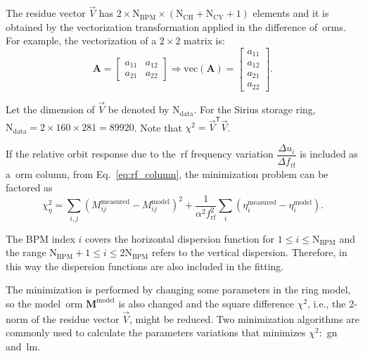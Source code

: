 The residue vector $\vec{V}$ has $2 \times \mathrm{N}_{\mathrm{BPM}} \times \left(\mathrm{N}_{\mathrm{CH}} + \mathrm{N}_{\mathrm{CV}}+1\right)$ elements and it is obtained by the vectorization transformation applied in the difference of~\gls{orm}s. For example, the vectorization of a $2 \times 2$ matrix is:
\begin{equation}
        \mathbf{A} = \begin{bmatrix}
     a_{11} & a_{12} \\
     a_{21} & a_{22} 
\end{bmatrix} \Rightarrow \mathrm{vec}\left(\mathbf{A}\right) = \begin{bmatrix}
     a_{11}  \\
     a_{12} \\
     a_{21} \\ 
     a_{22} 
\end{bmatrix}.
\end{equation}

Let the dimension of $\vec{V}$ be denoted by $\mathrm{N}_{\mathrm{data}}$. For the Sirius storage ring, $\mathrm{N}_{\mathrm{data}} = 2 \times 160 \times 281 = 89920$. Note that $\chi^2 = \vec{V}^{\mathsf{T}}\vec{V}$.

If the relative orbit response due to the~\gls{rf} frequency variation $\dfrac{\Delta u_i}{\Delta f_{\mathrm{rf}}}$ is included as a~\gls{orm} column, from Eq.~\eqref{eq:rf_column}, the minimization problem can be factored as
\begin{equation}
    \chi^2_{\eta} = \sum_{i, j} \left(M^{\mathrm{measured}}_{ij} - M^{\mathrm{model}}_{ij}\right)^2 + \dfrac{1}{\alpha^2 f_{\mathrm{rf}}^2}\sum_{i}\left(\eta^{\mathrm{measured}}_{i} - \eta^{\mathrm{model}}_{i}\right).
    \label{eq:chi2_disp}
\end{equation}

The BPM index $i$ covers the horizontal dispersion function for $1 \leq i \leq \mathrm{N}_{\mathrm{BPM}}$ and the range $\mathrm{N}_{\mathrm{BPM}}+1 \leq i \leq 2\mathrm{N}_{\mathrm{BPM}}$ refers to the vertical dispersion. Therefore, in this way the dispersion functions are also included in the fitting.

The minimization is performed by changing some parameters in the ring model, so the model~\gls{orm} $\mathbf{M}^{\mathrm{model}}$ is also changed and the square difference $\chi^2$, i.e., the 2-norm of the residue vector $\vec{V}$, might be reduced. Two minimization algorithms are commonly used to calculate the parameters variations that minimizes $\chi^2$:~\gls{gn} and~\gls{lm}.

